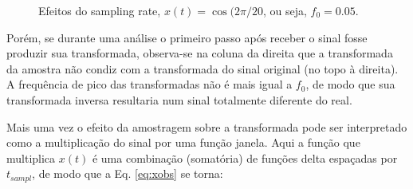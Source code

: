 \begin{figure}[ht!]
	\caption{Efeitos do sampling rate, $x(t) = \cos(2 \pi /20$, ou seja, $f_{0}=0.05$.}
	\vspace{1mm}	%
	\begin{center}
	\end{center}
	\vspace{1mm}	%
	\label{fig:sampling_20}
\end{figure}

Porém, se durante uma análise o primeiro passo após receber o sinal fosse produzir sua transformada, observa-se na coluna da direita que a transformada da amostra não condiz com a transformada do sinal original (no topo à direita). A frequência de pico das transformadas não é mais igual a $f_{0}$, de modo que sua transformada inversa resultaria num sinal totalmente diferente do real.

Mais uma vez o efeito da amostragem sobre a transformada pode ser interpretado como a multiplicação do sinal por uma função janela. Aqui a função que multiplica $x(t)$ é uma combinação (somatória) de funções delta espaçadas por $t_{sampl}$, de modo que a Eq. \ref{eq:xobs} se torna:

